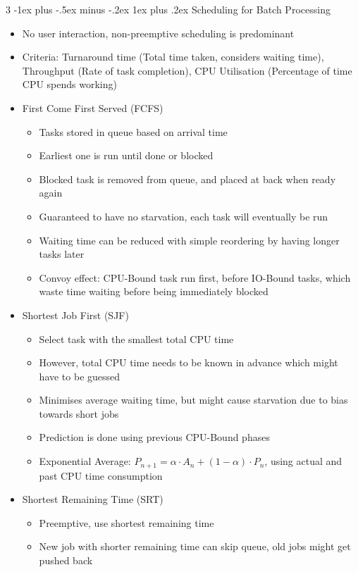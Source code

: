 \documentclass[10pt, landscape]{article}
\makeatletter
\renewcommand{\subsection}{\@startsection{subsection}{3}{0mm}%
                                {-1ex plus -.5ex minus -.2ex}%
                                {1ex plus .2ex}%
                                {\normalfont\small\bfseries}}%
\makeatother
\begin{document}
\begin{multicols*}{3}
\subsection{Scheduling for Batch Processing}
\begin{itemize}
    \item No user interaction, non-preemptive scheduling is predominant
    \item Criteria: Turnaround time (Total time taken, considers waiting time), Throughput (Rate of task completion), CPU Utilisation (Percentage of time CPU spends working)
    \item First Come First Served (FCFS)
    \begin{itemize}
        \item Tasks stored in queue based on arrival time
        \item Earliest one is run until done or blocked
        \item Blocked task is removed from queue, and placed at back when ready again
        \item Guaranteed to have no starvation, each task will eventually be run
        \item Waiting time can be reduced with simple reordering by having longer tasks later
        \item Convoy effect: CPU-Bound task run first, before IO-Bound tasks, which waste time waiting before being immediately blocked
    \end{itemize}
    \item Shortest Job First (SJF)
    \begin{itemize}
        \item Select task with the smallest total CPU time
        \item However, total CPU time needs to be known in advance which might have to be guessed
        \item Minimises average waiting time, but might cause starvation due to bias towards short jobs
        \item Prediction is done using previous CPU-Bound phases
        \item Exponential Average: $P_{n+1}=\alpha \cdot A_n+(1-\alpha)\cdot P_n$, using actual and past CPU time consumption
    \end{itemize}
    \item Shortest Remaining Time (SRT)
    \begin{itemize}
        \item Preemptive, use shortest remaining time
        \item New job with shorter remaining time can skip queue, old jobs might get pushed back
    \end{itemize}
\end{itemize}


\end{multicols*}
\end{document}
